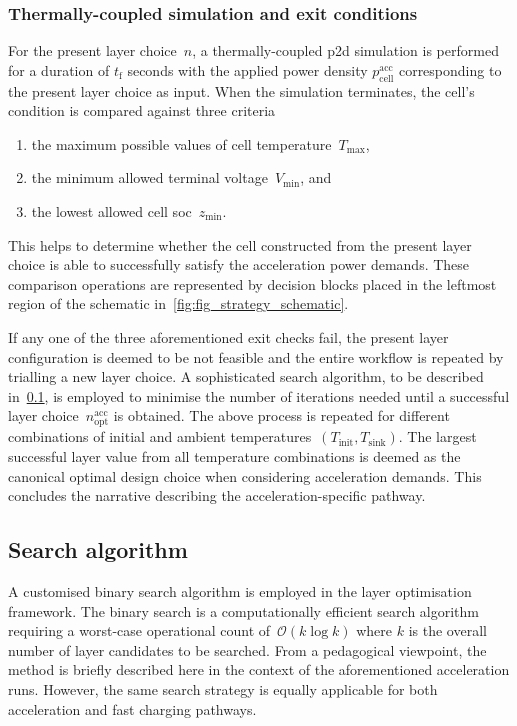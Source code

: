 \subsubsection*{Thermally-coupled  simulation and exit
conditions}\label{sec:accexitconditions}

For the  present layer choice~$n$,  a thermally-coupled \gls{p2d}  simulation is
performed for a duration of $t_\text{f}$  seconds with the applied power density
$p^\text{acc}_\text{cell}$ corresponding to the present layer choice as input.
When the simulation terminates, the cell's condition is compared against three
criteria
\begin{enumerate}
    \item the maximum possible values of cell temperature~$T_\text{max}$,
    \item the minimum allowed terminal voltage~$V_\text{min}$, and
    \item the lowest allowed cell \gls{soc}~$z_\text{min}$.
\end{enumerate}
This helps to determine whether the cell constructed from the present layer
choice is able to successfully satisfy the acceleration power demands. These
comparison operations are represented by decision blocks placed in the leftmost
region of the schematic in~\cref{fig:fig_strategy_schematic}.

If  any one  of the  three aforementioned  exit checks  fail, the  present layer
configuration is deemed  to be not feasible and the  entire workflow is repeated
by  trialling a  new  layer  choice. A  sophisticated  search  algorithm, to  be
described  in~\cref{sec:searchalgo},  is  employed  to minimise  the  number  of
iterations needed  until a successful layer  choice~$n_\text{opt}^\text{acc}$ is
obtained. The  above process is  repeated for different combinations  of initial
and  ambient temperatures~\mbox{$(T_\text{init},  T_\text{sink})$}. The  largest
successful  layer value  from  all  temperature combinations  is  deemed as  the
canonical  optimal design  choice  when considering  acceleration demands.  This
concludes the narrative describing the acceleration-specific pathway.

\subsection{Search algorithm}\label{sec:searchalgo}

A  customised binary  search algorithm  is  employed in  the layer  optimisation
framework. The  binary search  is a  computationally efficient  search algorithm
requiring a worst-case operational count of~$\mathcal{O}(k \log k)$ where $k$ is
the  overall number  of  layer candidates  to be  searched.  From a  pedagogical
viewpoint,  the  method  is  briefly  described  here  in  the  context  of  the
aforementioned acceleration runs.  However, the same search  strategy is equally
applicable for both acceleration and fast charging pathways.

